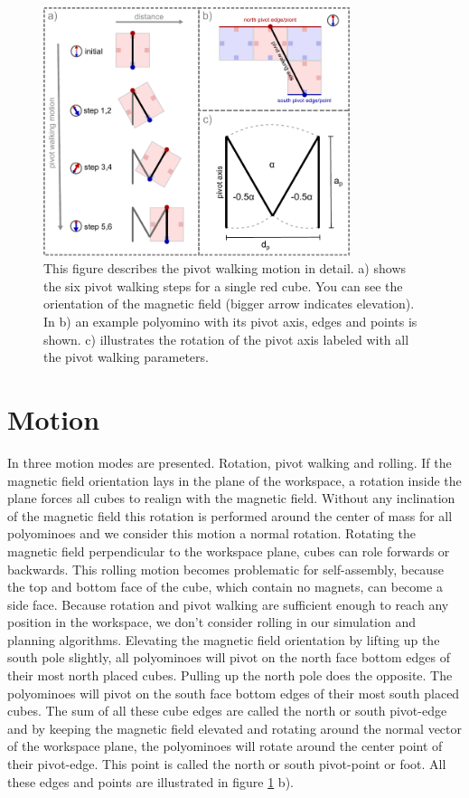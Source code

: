 \begin{figure}
	\centering
	\includegraphics[width=0.80\textwidth]{figures/pivot_walking.pdf}
	\caption{This figure describes the pivot walking motion in detail. a) shows the six pivot walking steps for a single red cube. You can see the orientation of the magnetic field (bigger arrow indicates elevation). In b) an example polyomino with its pivot axis, edges and points is shown. c) illustrates the rotation of the pivot axis labeled with all the pivot walking parameters.}
	\label{fig:pivot_walking}
\end{figure}

\section{Motion}
In \cite{Bhattacharjee2022} three motion modes are presented. Rotation, pivot walking and rolling.
If the magnetic field orientation lays in the plane of the workspace, a rotation inside the plane forces all cubes to realign with the magnetic field.
Without any inclination of the magnetic field this rotation is performed around the center of mass for all polyominoes and we consider this motion a normal rotation.
Rotating the magnetic field perpendicular to the workspace plane, cubes can role forwards or backwards.
This rolling motion becomes problematic for self-assembly, because the top and bottom face of the cube, which contain no magnets, can become a side face.
Because rotation and pivot walking are sufficient enough to reach any position in the workspace, we don't consider rolling in our simulation and planning algorithms.
Elevating the magnetic field orientation by lifting up the south pole slightly, all polyominoes will pivot on the north face bottom edges of their most north placed cubes.
Pulling up the north pole does the opposite. The polyominoes will pivot on the south face bottom edges of their most south placed cubes.
The sum of all these cube edges are called the north or south pivot-edge and by keeping the magnetic field elevated and rotating around the normal vector of the workspace plane, the polyominoes will rotate around the center point of their pivot-edge.
This point is called the north or south pivot-point or foot.
All these edges and points are illustrated in figure \ref{fig:pivot_walking} b).

